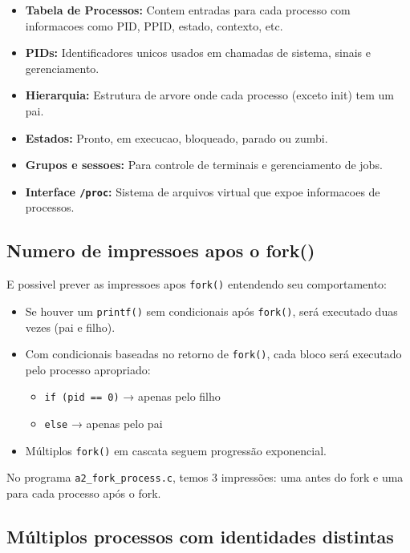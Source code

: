 \documentclass[10pt]{article}
\begin{document}
\begin{itemize}\itemsep0em
    \item \textbf{Tabela de Processos:} Contem entradas para cada processo com informacoes como PID, PPID, estado, contexto, etc.
    \item \textbf{PIDs:} Identificadores unicos usados em chamadas de sistema, sinais e gerenciamento.
    \item \textbf{Hierarquia:} Estrutura de arvore onde cada processo (exceto init) tem um pai.
    \item \textbf{Estados:} Pronto, em execucao, bloqueado, parado ou zumbi.
    \item \textbf{Grupos e sessoes:} Para controle de terminais e gerenciamento de jobs.
    \item \textbf{Interface \texttt{/proc}:} Sistema de arquivos virtual que expoe informacoes de processos.
\end{itemize}

\subsection{Numero de impressoes apos o fork()}

E possivel prever as impressoes apos \texttt{fork()} entendendo seu comportamento:

\begin{itemize}\itemsep0em
    \item Se houver um \texttt{printf()} sem condicionais após \texttt{fork()}, será executado duas vezes (pai e filho).
    \item Com condicionais baseadas no retorno de \texttt{fork()}, cada bloco será executado pelo processo apropriado:
      \begin{itemize}\itemsep0em
        \item \texttt{if (pid == 0)} → apenas pelo filho
        \item \texttt{else} → apenas pelo pai
      \end{itemize}
    \item Múltiplos \texttt{fork()} em cascata seguem progressão exponencial.
\end{itemize}

No programa \texttt{a2\_fork\_process.c}, temos 3 impressões: uma antes do fork e uma para cada processo após o fork.

\subsection{Múltiplos processos com identidades distintas}
\end{document}

